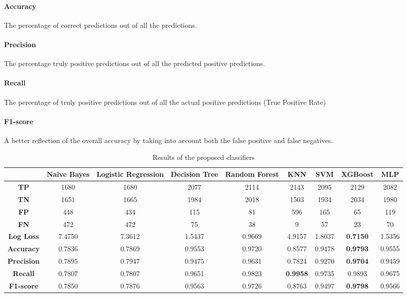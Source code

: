 \documentclass[conference]{IEEEtran}
\begin{document}
\paragraph{Accuracy}
The percentage of correct predictions out of all the predictions. 
\paragraph{Precision}
The percentage truly positive predictions out of all the predicted positive predictions. 
\paragraph{Recall}
The percentage of truly positive predictions out of all the actual positive predictions (True Positive Rate)
\paragraph{F1-score}
A better reflection of the overall accuracy by taking into account both the false positive and false negatives. 

 \begin{table}[!t]
    \renewcommand{\arraystretch}{1.5}
    \caption{Results of the proposed classifiers}
    \label{table:results}
    \centering
    \setlength{\tabcolsep}{9pt}
    \begin{tabular}{c c c c c c c c c}
        \hline 
        \bfseries  & \bfseries Naive Bayes & \bfseries Logistic Regression & \bfseries Decision Tree & \bfseries Random Forest & \bfseries KNN & \bfseries SVM & \bfseries XGBoost & \bfseries MLP \\
        \hline  
        \textbf{TP} &  1680 & 1680 & 2077 & 2114  &  2143  &   2095  & 2129 &   2082  \\
        \textbf{TN} & 1651  & 1665 &  1984 & 2018 &  1503  & 1934  &  2034 & 1980  \\
        \textbf{FP} & 448  &  434 & 115  &  81  & 596  & 165   &  65 & 119 \\
        \textbf{FN} & 472 & 472 &  75 &  38 &   9 & 57 &   23 &  70 \\
        \hline 
        \textbf{Log Loss} & 7.4750 & 7.3612 &  1.5437 &  0.9669 & 4.9157  & 1.8037 & \textbf{0.7150} &  1.5356 \\ 
        \textbf{Accuracy} & 0.7836 & 0.7869  &  0.9553 &  0.9720  & 0.8577   & 0.9478 & \textbf{0.9793} &  0.9555  \\ 
        \textbf{Precision} & 0.7895 & 0.7947 &  0.9475  & 0.9631 & 0.7824  &  0.9270 & \textbf{0.9704}  &   0.9459 \\ 
        \textbf{Recall} & 0.7807  & 0.7807 &  0.9651  &   0.9823  & \textbf{0.9958}  &  0.9735 & 0.9893   &  0.9675 \\ 
        \textbf{F1-score} &  0.7850  &  0.7876 & 0.9563 & 0.9726  &  0.8763   & 0.9497 & \textbf{0.9798}  & 0.9566  \\
    \hline
    \end{tabular}
\end{table}
\end{document}
